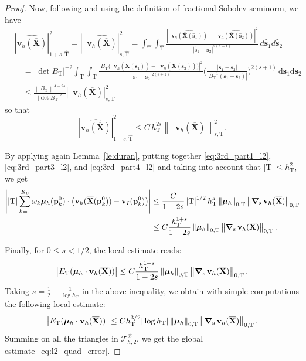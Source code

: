 \documentclass[oneside]{amsart} %
\newcommand{\norm}[1]{\left\lVert#1\right\rVert}
\newcommand{\abs}[1]{\left\lvert#1\right\rvert}
\DeclareMathOperator{\grads}{\boldsymbol\nabla_s}
\newcommand\B{\mathcal B} %
\renewcommand\v{\mathbf{v}} %
\newcommand\s{\mathbf{s}} %
\newcommand\X{\mathbf{X}} %
\newcommand\Xbar{\overline{\X}} %
\newcommand\mmu{{\boldsymbol\mu}} %
\newcommand\ds{\mathrm{d}\s} %
\newcommand\T{\mathcal{T}} %
\newcommand\quadnode{\mathbf{p}}
\newcommand\quadweigth{\omega}
\newcommand\tri{\mathrm{T}} %
\newcommand\reftri{\widehat{\tri}} %
\newcommand\DB{\begin{color}{black}}
\newcommand\BD{\end{color}}
\begin{document}
\begin{proof}
		Now, following \cite{dupont1980polynomial} and using the definition of fractional Sobolev seminorm, we have
		\small
		\begin{equation*}
			\begin{aligned}
				&\abs{\widehat{\v_h(\Xbar)}}_{1+s,\reftri}^2
				= \abs{\grads\widehat{\v_h(\Xbar)}}_{s,\reftri}^2
				= \int_{\reftri} \int_{\reftri} \frac{\abs{\grads\widehat{\v_h(\Xbar(\widehat{\s}_1))}-\grads\widehat{\v_h(\Xbar(\widehat{\s}_2))}}^2 }{\abs{\widehat{\s}_1-\widehat{\s}_2}^{2(s+1)}} \,d\widehat{\s}_1d\widehat{\s}_2\\
				&\quad= \abs{\det B_\tri}^{-2} \int_{\tri} \int_{\tri} \frac{\abs{B_\tri \big(\grads\v_h(\Xbar(\s_1))-\grads\v_h(\Xbar(\s_2))\big)}^2}{\abs{\s_1-\s_2}^{2(s+1)}} \bigg(\frac{\abs{\s_1-\s_2}}{\abs{B_\tri^{-1}(\s_1-\s_2)}}\bigg)^{2(s+1)}\,\ds_1\ds_2\\
				&\quad\le \frac{\norm{B_\tri}^{4+2s}}{\abs{\det B_\tri}^2} \abs{\grads\v_h(\Xbar)}_{s,\tri}^2 
			\end{aligned}
		\end{equation*}
		\normalsize
		so that
		\begin{equation}\label{eq:3rd_part4_l2}
			\abs{\widehat{\v_h(\Xbar)}}_{1+s,\reftri}^2 \le C\,h_\tri^{2s} \norm{\grads\v_h(\Xbar)}_{s,\tri}^2.
		\end{equation}
		
		By applying again Lemma~\ref{le:duran}, putting together
		\eqref{eq:3rd_part1_l2}, \eqref{eq:3rd_part3_l2}, and \eqref{eq:3rd_part4_l2} 
		and taking into account that $\abs{\tri}\le h_\tri^2$, we get
		\begin{equation}\label{eq:3rd_term_l2}
			\begin{aligned}
				\abs{\abs{\tri} \sum_{k=1}^{K_0}\quadweigth_k \mmu_h(\quadnode_k^0)\cdot \big(\v_h(\Xbar(\quadnode_k^0))-\v_I(\quadnode_k^0)\big)}
				&\le \frac{C}{1-2s} \abs{\tri}^{1/2} h_\tri^s
				\norm{\mmu_h}_{0,\tri} \DB\norm{\grads\v_h(\Xbar)}_{0,\tri}\BD\\
				&\le C\frac{h_\tri^{1+s}}{1-2s}\norm{\mmu_h}_{0,\tri}
				\norm{\grads\v_h(\Xbar)}_{0,\tri}.
			\end{aligned}
		\end{equation}
		
		Finally, for $0\le s<1/2$, the local estimate reads: 
		\begin{equation}\label{eq:local_l2_estimate}
			\abs{E_\tri(\mmu_h\cdot\v_h(\Xbar))}
			\le C \frac{h_\tri^{1+s}}{1-2s}
			\norm{\mmu_h}_{0,\tri}\DB\norm{\grads\v_h(\Xbar)}_{0,\tri}\BD.
		\end{equation}
		Taking $s=\frac12+\frac1{\log h_\tri}$ in the above inequality, we obtain with
		simple computations the following local estimate:
		\begin{equation}
			\abs{E_\tri(\mmu_h\cdot\v_h(\Xbar))}\le Ch_\tri^{3/2}|\log h_\tri|
			\norm{\mmu_h}_{0,\tri}\DB\norm{\grads\v_h(\Xbar)}_{0,\tri}\BD.
			\label{eq:disallineata}
		\end{equation}
		Summing on all the triangles in $\T_{h,2}^\B$, we get the global
		estimate~\eqref{eq:l2_quad_error}.%
	\end{proof}
	
\end{document}
